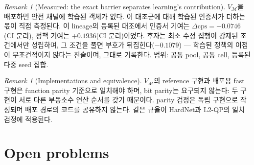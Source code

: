 \documentclass[11pt]{article}
\theoremstyle{plain}
\theoremstyle{definition}
\theoremstyle{remark}
\newtheorem{remark}[theorem]{Remark}
\begin{document}
\begin{remark}[Measured: the exact barrier separates learning's contribution]\label{rem:vm-measured}
$V_{\mathcal M}$을 배포하면 안전 채널에 학습된 객체가 없다. 이 대조군에 대해 학습된 인증서가
더하는 몫이 직접 측정된다. 이 lineage의 등록된 대조에서 인증서 기여는
$\Delta\mathrm{cps}=+0.0746$(CI 분리), 정책 기여는 $+0.1936$(CI 분리)이었다. 후자는 최소 수정
집행이 강제된 조건에서만 성립하며, 그 조건을 풀면 부호가 뒤집힌다($-0.1079$) --- 학습된 정책의
이점이 무조건적이지 않다는 진술이며, 그대로 기록한다. 범위: 공통 pool, 공통 cell, 등록된 다중
seed 집합.
\end{remark}

\begin{remark}[Implementations and equivalence]\label{rem:vm-impl}
$V_{\mathcal M}$의 reference 구현과 배포용 fast 구현은 function parity 기준으로 일치해야 하며,
bit parity는 요구되지 않는다: 두 구현이 서로 다른 부동소수 연산 순서를 갖기 때문이다. parity
검정은 독립 구현으로 작성되며 배포 경로의 코드를 공유하지 않는다. 같은 규율이 HardNet과 L2-QP의
일치 검정에 적용된다.
\end{remark}

\section{Open problems}\label{sec:open}
\end{document}
